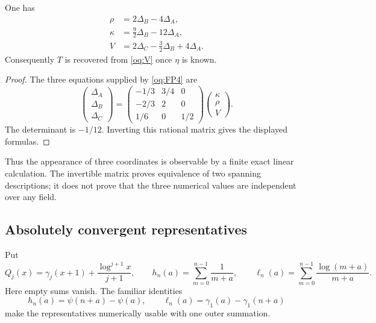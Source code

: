 \begin{corollary}\label{oq:reconstruction}
One has
\begin{align}
 \rho&=2\Delta_B-4\Delta_A,\label{oq:recoverrho}\\
 \kappa&=\frac92\Delta_B-12\Delta_A,\label{oq:recoverkappa}\\
 V&=2\Delta_C-\frac32\Delta_B+4\Delta_A.\label{oq:recoverV}
\end{align}
Consequently $T$ is recovered from \eqref{oq:V} once $\eta$ is known.
\end{corollary}
\begin{proof}
The three equations supplied by \eqref{oq:FP4} are
\[
 \begin{pmatrix}\Delta_A\\\Delta_B\\\Delta_C\end{pmatrix}
 =\begin{pmatrix}-1/3&3/4&0\\-2/3&2&0\\1/6&0&1/2\end{pmatrix}
 \begin{pmatrix}\kappa\\\rho\\V\end{pmatrix}.
\]
The determinant is $-1/12$. Inverting this rational matrix gives the
displayed formulas.
\end{proof}

Thus the appearance of three coordinates is observable by a finite exact
linear calculation. The invertible matrix proves equivalence of two
spanning descriptions; it does not prove that the three numerical values
are independent over any field.

\subsection{Absolutely convergent representatives}

Put
\[
 Q_j(x)=\gamma_j(x+1)+\frac{\log^{j+1}x}{j+1},\qquad
 h_n(a)=\sum_{m=0}^{n-1}\frac1{m+a},\qquad
 \ell_n(a)=\sum_{m=0}^{n-1}\frac{\log(m+a)}{m+a}.
\]
Here empty sums vanish. The familiar identities
\[
 h_n(a)=\psi(n+a)-\psi(a),\qquad
 \ell_n(a)=\gamma_1(a)-\gamma_1(n+a)
\]
make the representatives numerically usable with one outer summation.

